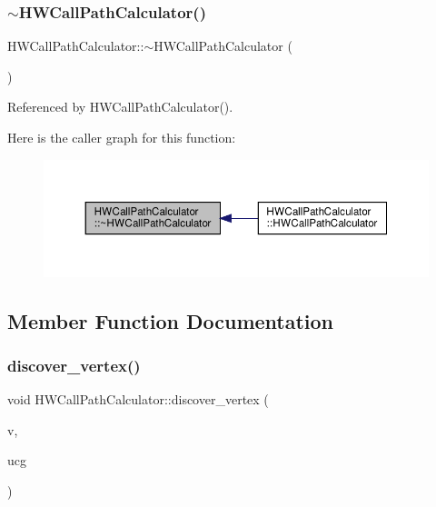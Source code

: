 \subsubsection{\texorpdfstring{$\sim$\+H\+W\+Call\+Path\+Calculator()}{~HWCallPathCalculator()}}
{\footnotesize\ttfamily H\+W\+Call\+Path\+Calculator\+::$\sim$\+H\+W\+Call\+Path\+Calculator (\begin{DoxyParamCaption}{ }\end{DoxyParamCaption})\hspace{0.3cm}{\ttfamily [default]}}



Referenced by H\+W\+Call\+Path\+Calculator().

Here is the caller graph for this function\+:
\nopagebreak
\begin{figure}[H]
\begin{center}
\leavevmode
\includegraphics[width=350pt]{da/d67/classHWCallPathCalculator_a6fe2e7835e140de731dab17331fa8512_icgraph}
\end{center}
\end{figure}


\subsection{Member Function Documentation}
\mbox{\label{classHWCallPathCalculator_a53001ec23cdf7629228bbca0cb46750f}} 
\subsubsection{\texorpdfstring{discover\+\_\+vertex()}{discover\_vertex()}}
{\footnotesize\ttfamily void H\+W\+Call\+Path\+Calculator\+::discover\+\_\+vertex (\begin{DoxyParamCaption}\item[{const \hyperlink{UnfoldedCallGraph_8hpp_a6c87395c9d950d587c8e4db39b93e3e2}{Unfolded\+Vertex\+Descriptor} \&}]{v,  }\item[{const \hyperlink{classUnfoldedCallGraph}{Unfolded\+Call\+Graph} \&}]{ucg }\end{DoxyParamCaption})}



